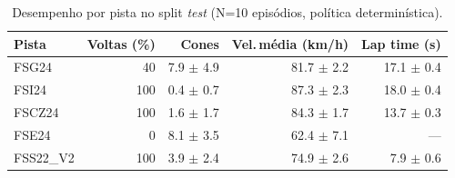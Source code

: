 \begin{table}[H]
\centering
\caption{Desempenho por pista no split \textit{test} (N=10 episódios, política determinística).}
\label{tab:per_track_test}
\begin{tabular}{lrrrr}
\toprule
\textbf{Pista} & \textbf{Voltas (\%)} & \textbf{Cones} & \textbf{Vel.\,m\'edia (km/h)} & \textbf{Lap time (s)} \\
\midrule
FSG24 & 40 & 7.9 $\pm$ 4.9 & 81.7 $\pm$ 2.2 & 17.1 $\pm$ 0.4 \\
FSI24 & 100 & 0.4 $\pm$ 0.7 & 87.3 $\pm$ 2.3 & 18.0 $\pm$ 0.4 \\
FSCZ24 & 100 & 1.6 $\pm$ 1.7 & 84.3 $\pm$ 1.7 & 13.7 $\pm$ 0.3 \\
FSE24 & 0 & 8.1 $\pm$ 3.5 & 62.4 $\pm$ 7.1 & --- \\
FSS22_V2 & 100 & 3.9 $\pm$ 2.4 & 74.9 $\pm$ 2.6 & 7.9 $\pm$ 0.6 \\
\bottomrule
\end{tabular}
\end{table}
